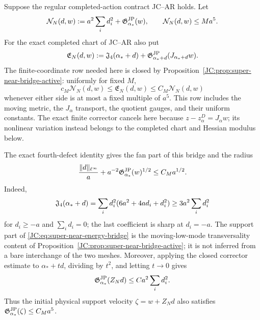 \begin{contract}
\label{JC:con:JC-SP}
Suppose the regular completed-action contract JC--AR holds.  Let
\begin{equation}\label{JC:eq:super-near-energy}
 \mathcal N_N(d,w):=
 a^2\sum_i d_i^2+\mathfrak G^{\rm JP}_{\alpha_*}(w),
 \qquad
 \mathcal N_N(d,w)\le Ma^5.
\end{equation}
For the exact completed chart of JC--AR also put
\begin{equation}\label{JC:eq:finite-completed-energy}
 \mathfrak E_N(d,w):=
 \mathfrak J_4(\alpha_*+d)+
 \mathfrak G^{\rm JP}_{\alpha_*+d}(J_{\alpha_*+d}w).
\end{equation}
The finite-coordinate row needed here is closed by
Proposition~\ref{JC:prop:super-near-bridge-active}: uniformly for fixed $M$,
\begin{equation}\label{JC:eq:super-near-energy-bridge}
 c_M\mathcal N_N(d,w)\le\mathfrak E_N(d,w)
 \le C_M\mathcal N_N(d,w)
\end{equation}
whenever either side is at most a fixed multiple of $a^5$.  This row
includes the moving metric, the $J_\alpha$ transport, the quotient gauges,
and their uniform constants.  The exact finite corrector cancels here
because $z-z_\alpha^D=J_\alpha w$; its nonlinear variation instead belongs
to the completed chart and Hessian modulus below.

The exact fourth-defect identity gives the fan part of this bridge and the
radius
\begin{equation}\label{JC:eq:super-near-radius}
 \frac{\|d\|_{\ell^\infty}}a+
 a^{-2}\mathfrak G^{\rm JP}_{\alpha_*}(w)^{1/2}
 \le C_Ma^{1/2}.
\end{equation}
Indeed,
\[
 \mathfrak J_4(\alpha_*+d)
 =\sum_i d_i^2(6a^2+4ad_i+d_i^2)
 \ge3a^2\sum_i d_i^2
\]
for $d_i\ge-a$ and $\sum_i d_i=0$; the last coefficient is sharp at
$d_i=-a$.  The support part of
\eqref{JC:eq:super-near-energy-bridge} is the moving-low-mode transversality
content of Proposition~\ref{JC:prop:super-near-bridge-active}; it is not
inferred from a bare interchange of the two meshes.
Moreover, applying the closed corrector estimate to
$\alpha_*+td$, dividing by $t^2$, and letting $t\to0$ gives
\begin{equation}\label{JC:eq:corrector-derivative-bound}
 \mathfrak G^{\rm JP}_{\alpha_*}(Z_Nd)\le Ca^2\sum_i d_i^2.
\end{equation}
Thus the initial physical support velocity
$\zeta=w+Z_Nd$ also satisfies
$\mathfrak G^{\rm JP}_{\alpha_*}(\zeta)\le C_Ma^5$.


\end{contract}
